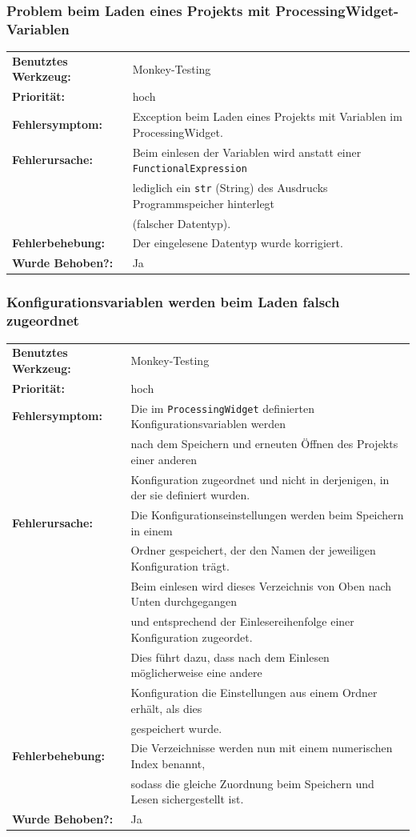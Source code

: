 \documentclass{article}
\newcommand{\classref}[1]{\texttt{#1}}
\begin{document}
\subsubsection*{Problem beim Laden eines Projekts mit ProcessingWidget-Variablen}
\begin{tabular}{ll}
    \textbf{Benutztes Werkzeug:} & Monkey-Testing\\
    \textbf{Priorität:} & hoch\\
    \textbf{Fehlersymptom:} & Exception beim Laden eines Projekts mit Variablen im ProcessingWidget.\\
    \textbf{Fehlerursache:} & Beim einlesen der Variablen wird anstatt einer \classref{FunctionalExpression}\\
    & lediglich ein \classref{str} (String) des Ausdrucks Programmspeicher hinterlegt\\
    & (falscher Datentyp).\\
    \textbf{Fehlerbehebung:} & Der eingelesene Datentyp wurde korrigiert.\\
    \textbf{Wurde Behoben?:} & Ja\\
\end{tabular}

\subsubsection*{Konfigurationsvariablen werden beim Laden falsch zugeordnet}
\begin{tabular}{ll}
    \textbf{Benutztes Werkzeug:} & Monkey-Testing\\
    \textbf{Priorität:} & hoch\\
    \textbf{Fehlersymptom:} & Die im \classref{ProcessingWidget} definierten Konfigurationsvariablen werden\\
    & nach dem Speichern und erneuten Öffnen des Projekts einer anderen\\
    & Konfiguration zugeordnet und nicht in derjenigen, in der sie definiert wurden.\\
    \textbf{Fehlerursache:} & Die Konfigurationseinstellungen werden beim Speichern in einem\\
    & Ordner gespeichert, der den Namen der jeweiligen Konfiguration trägt.\\
    & Beim einlesen wird dieses Verzeichnis von Oben nach Unten durchgegangen\\
    & und entsprechend der Einlesereihenfolge einer Konfiguration zugeordet.\\
    & Dies führt dazu, dass nach dem Einlesen möglicherweise eine andere\\
    & Konfiguration die Einstellungen aus einem Ordner erhält, als dies\\
    & gespeichert wurde.\\
    \textbf{Fehlerbehebung:} & Die Verzeichnisse werden nun mit einem numerischen Index benannt,\\
    &sodass die gleiche Zuordnung beim Speichern und Lesen sichergestellt ist.\\
    \textbf{Wurde Behoben?:} & Ja\\
\end{tabular}
\end{document}
